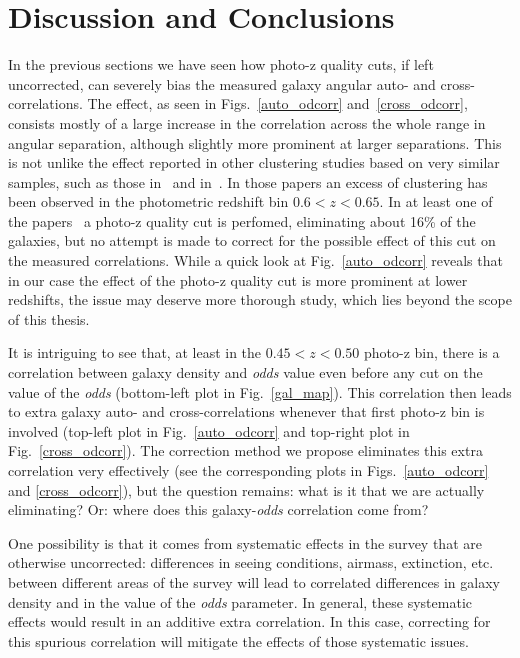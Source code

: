 \section{Discussion and Conclusions}
\label{sec:discussion}
%
In the previous sections we have seen how photo-z
quality cuts, if left uncorrected, can severely bias the measured
galaxy angular auto- and cross-correlations. The effect, as seen in
Figs.~\ref{auto_odcorr} and~\ref{cross_odcorr}, consists mostly of a
large increase in the correlation across the whole range in angular
separation, although slightly more prominent at larger
separations. This is not unlike the effect reported in other clustering
studies based on very similar samples, such as those in~\citet{Thomas2011a}
and in~\citet{Crocce2011}. In those papers an excess of clustering has
been observed in the photometric redshift bin $0.6 < z < 0.65$. In at
least one of the papers~\citep{Crocce2011} a photo-z quality cut is
perfomed, eliminating about 16\% of the galaxies, but no attempt is
made to correct for the possible effect of this cut on the measured
correlations.  While a quick look at Fig.~\ref{auto_odcorr} reveals
that in our case the effect of the photo-z quality cut is more
prominent at lower redshifts, the issue may deserve more thorough study, 
which lies beyond the scope of this thesis.

It is intriguing to see that, at least in the $0.45 < z < 0.50$
photo-z bin, there is a correlation between galaxy density and 
{\em odds} value even before any cut on the value of the {\em odds}
(bottom-left plot in Fig.~\ref{gal_map}). This
correlation then leads to extra galaxy auto- and cross-correlations
whenever that first photo-z bin is involved (top-left plot in
Fig.~\ref{auto_odcorr} and top-right plot in Fig.~\ref{cross_odcorr}). 
The correction method we propose
eliminates this extra correlation very effectively (see the corresponding plots in
Figs.~\ref{auto_odcorr} and \ref{cross_odcorr}), but the question
remains: what is it that we are actually eliminating? Or: where does
this galaxy-{\em odds} correlation come from? 

One possibility is that
it comes from systematic effects in the survey that are otherwise
uncorrected: differences in seeing conditions, airmass, extinction,
etc. between different areas of the survey will lead to correlated differences in
galaxy density and in the value of the {\em odds} parameter. In
general, these systematic effects would result in an additive extra
correlation. In this case, correcting for this
spurious correlation will mitigate the effects of those systematic issues.

